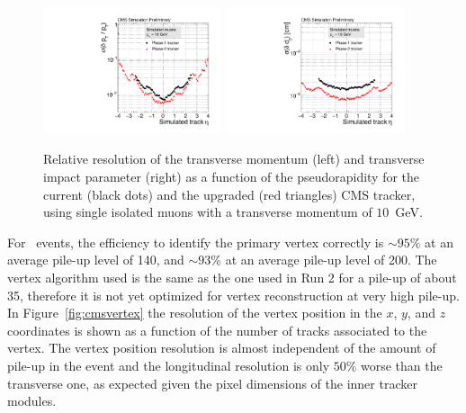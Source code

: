 \begin{figure}[h!tbp]
\begin{center}
  \includegraphics[width=0.47\textwidth]{figures/cmsupgrade/TDR-17-001_fig6_12_a_ptres_vs_eta_Sigma_vsPhase1.pdf} \hfill
  \includegraphics[width=0.47\textwidth]{figures/cmsupgrade/TDR-17-001_fig6_12_b_dxyres_vs_eta_Sigma_vsPhase1.pdf}
  \caption{Relative resolution of the transverse momentum (left) and transverse impact parameter (right) as a function of the pseudorapidity for the current (black dots) and the upgraded (red triangles) CMS tracker, using single isolated muons with a transverse momentum of $10$~GeV.}
  \label{fig:cmstrackres}
\end{center}
\end{figure}

For \ttbar~events, the efficiency to identify the primary vertex correctly is $\sim 95\%$ at an average pile-up level of 140, and $\sim93\%$ at an average pile-up level of 200. The vertex algorithm used is the same as the one used in Run 2 for a pile-up of about 35, therefore it is not yet optimized for vertex reconstruction at very high pile-up. In Figure~\ref{fig:cmsvertex} the resolution of the vertex position in the $x$, $y$, and $z$ coordinates is shown as a function of the number of tracks associated to the vertex. The vertex position resolution is almost independent of the amount of pile-up in the event and the longitudinal resolution is only $50\%$ worse than the transverse one, as expected given the pixel dimensions of the inner tracker modules.

